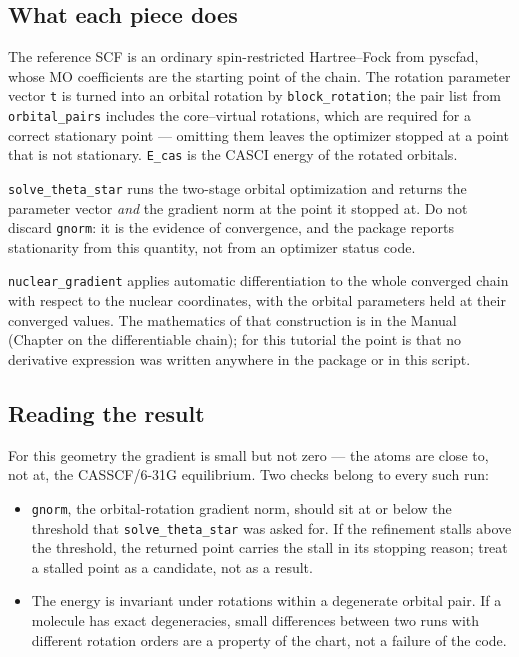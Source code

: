\subsection{What each piece does}

The reference SCF is an ordinary spin-restricted Hartree--Fock from
pyscfad, whose MO coefficients are the starting point of the chain.
The rotation parameter vector \texttt{t} is turned into an orbital
rotation by \texttt{block\_rotation}; the pair list from
\texttt{orbital\_pairs} includes the core--virtual rotations, which are
required for a correct stationary point --- omitting them leaves the
optimizer stopped at a point that is not stationary.  \texttt{E\_cas}
is the CASCI energy of the rotated orbitals.

\texttt{solve\_\allowbreak theta\_\allowbreak star} runs the two-stage orbital optimization
and returns the parameter vector \emph{and} the gradient norm at the
point it stopped at.  Do not discard \texttt{gnorm}: it is the
evidence of convergence, and the package reports stationarity from
this quantity, not from an optimizer status code.

\texttt{nuclear\_gradient} applies automatic differentiation to the
whole converged chain with respect to the nuclear coordinates, with
the orbital parameters held at their converged values.  The mathematics
of that construction is in the Manual (Chapter on the differentiable
chain); for this tutorial the point is that no derivative expression
was written anywhere in the package or in this script.

\subsection{Reading the result}

For this geometry the gradient is small but not zero --- the atoms are
close to, not at, the CASSCF/6-31G equilibrium.  Two checks belong to
every such run:

\begin{itemize}
  \item \texttt{gnorm}, the orbital-rotation gradient norm, should sit
    at or below the threshold that
    \texttt{solve\_\allowbreak theta\_\allowbreak star} was asked for.  If the refinement
    stalls above the threshold, the returned point carries the stall
    in its stopping reason; treat a stalled point as a candidate, not
    as a result.
  \item The energy is invariant under rotations within a degenerate
    orbital pair.  If a molecule has exact degeneracies, small
    differences between two runs with different rotation orders are a
    property of the chart, not a failure of the code.
\end{itemize}

